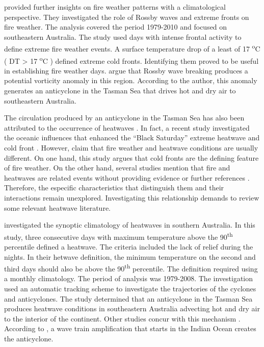 \citet{Reeder2015} provided further insights on fire weather patterns
with a climatological perspective. They investigated the role of Rossby
waves and extreme fronts on fire weather. The analysis covered the
period 1979-2010 and focused on southeastern Australia. The study
used days with intense frontal activity to define extreme fire weather
events. A surface temperature drop of a least of 17 \textsuperscript{o}C
( \textgreek{D}T > 17 \textsuperscript{o}C ) defined extreme cold
fronts. Identifying them proved to be useful in establishing fire
weather days. \citet{Reeder2015} argue that Rossby wave breaking
produces a potential vorticity anomaly in this region. According to
the author, this anomaly generates an anticyclone in the Tasman Sea
that drives hot and dry air to southeastern Australia. 

The circulation produced by an anticyclone in the Tasman Sea has also
been attributed to the occurrence of heatwaves \citep{Pezza2012,Parker2013,Boschat2014}.
In fact, a recent study investigated the oceanic influences that enhanced
the ``Black Saturday'' extreme heatwave and cold front \citep{Fiddes2015}.
However, \citet{Reeder2015} claim that fire weather and heatwave
conditions are usually different. On one hand, this study argues that
cold fronts are the defining feature of fire weather. On the other
hand, several studies mention that fire and heatwaves are related
events without providing evidence or further references \citep{Pezza2012,Parker2013,Boschat2014}.
Therefore, the especific characteristics that distinguish them and
their interactions remain unexplored. Investigating this relationship
demands to review some relevant heatwave literature.

\citet{Pezza2012} investigated the synoptic climatology of heatwaves
in southern Australia. In this study, three consecutive days with
maximum temperature above the 90\textsuperscript{th} percentile defined
a heatwave. The criteria included the lack of relief during the nights.
In their hetwave definition, the minimum temperature on the second
and third days should also be above the 90\textsuperscript{th} percentile.
The definition required using a monthly climatology. The period of
analysis was 1979-2008. The investigation used an automatic tracking
scheme \citep{Murray1999} to investigate the trajectories of the
cyclones and anticyclones. The study determined that an anticyclone
in the Tasman Sea produces heatwave conditions in southeastern Australia
advecting hot and dry air to the interior of the continent. Other
studies concur with this mechanism \citep{Parker2013,Parker2014a}.
According to \citet{Pezza2012}, a wave train amplification that starts
in the Indian Ocean creates the anticyclone. 

